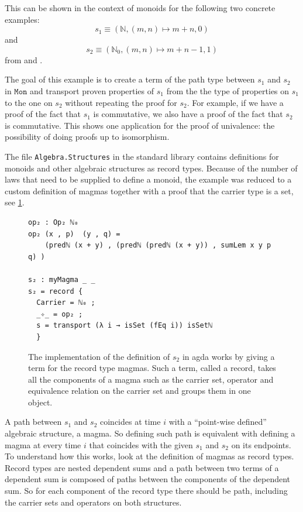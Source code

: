 \documentclass[12pt,a4paper,twoside,xetex]{book}
\newcommand{\op}[1]{\mathtt{#1}}
\begin{document}
This can be shown in the context of monoids for the following two concrete examples: $$s_1  \equiv (\mathbb{N}, (m,n)\mapsto m+n, 0)$$ and $$s_2 \equiv (\mathbb{N}_0, (m,n)\mapsto m+n -1, 1)$$ from \cite{Coquand2013} and \cite{Danielsson2012}. 

The goal of this example is to create a term of the path type between  $s_1$ and $s_2$ in $\op{Mon}$ and transport proven properties of $s_1$ from the the type of properties on $s_1$ to the one on $s_2$ without repeating the proof for $s_2$. For example, if we have a proof of the fact that $s_1$ is commutative, we also have a proof of the fact that $s_2$ is commutative. This shows one application for the proof of univalence: the possibility of doing proofs up to isomorphism. 

The file \texttt{Algebra.Structures} in the standard library  \cite{Danielsson2019} contains definitions for monoids and other algebraic structures as record types. Because of the number of  laws that need to be supplied to define a monoid, the example was reduced to a custom definition of magmas together with a proof that the carrier type is a set, see \cref{m2def}. 

\begin{figure}\label{m2def}
 \centering

 
\begin{BVerbatim}
op₂ : Op₂ ℕ₀
op₂ (x , p)  (y , q) = 
    (predℕ (x + y) , (predℕ (predℕ (x + y)) , sumLem x y p q) )

s₂ : myMagma _ _
s₂ = record {
  Carrier = ℕ₀ ;
  _✧_ = op₂ ;
  s = transport (λ i → isSet (fEq i)) isSetℕ
  }
\end{BVerbatim}
 
 \caption{The implementation of the definition of $s_2$ in agda works by giving a term for the record type magmas. Such a term, called a record, takes all the components of a magma such as the carrier set, operator and equivalence relation on the carrier set and groups them in one object.}
\end{figure}



A path between $s_1$ and $s_2$ coincides at time $i$ with a ``point-wise defined'' algebraic structure, a magma. So defining such path is equivalent with defining a magma at every time $i$ that coincides with the given $s_1$ and $s_2$ on its endpoints. To understand how this works, look at the definition of magmas as record types. Record types are nested dependent sums and a path between two terms of a dependent sum is composed of paths between the components of the dependent sum. So for each component of the record type there should be path, including the carrier sets and operators on both structures. 
\end{document}
